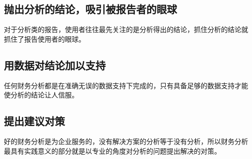\documentclass[a4paper]{article}
\begin{document}
\subsection{抛出分析的结论，吸引被报告者的眼球}
	
对于分析类的报告，使用者往往最先关注的是分析得出的结论，抓住分析的结论就抓住了报告使用者的眼球。

\subsection{用数据对结论加以支持}

任何财务分析都是在准确无误的数据支持下完成的，只有具备足够的数据支持才能使分析的结论让人信服。

\subsection{提出建议对策}
好的财务分析是为企业服务的，没有解决方案的分析等于没有分析，所以财务分析最具有实践意义的部分就是以专业的角度对分析的问题提出解决的对策。
\end{document}
